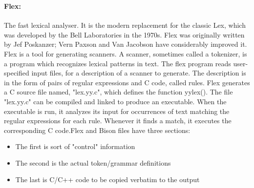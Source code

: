 \textbf{Flex:}\\\\
The fast lexical analyser. It is the modern replacement for the classic Lex, which was developed by the Bell Laboratories in the 1970s.
Flex was originally written by Jef Poskanzer; Vern Paxson and Van Jacobson have considerably improved it. Flex is a tool for generating scanners. A scanner, sometimes called a tokenizer, is a program which recognizes lexical patterns in text. The flex program reads user-specified input files, for a description of a scanner to generate. The description is in the form of pairs of regular expressions and C code, called rules. Flex generates a C source file named, "lex.yy.c", which defines the function yylex(). The file "lex.yy.c" can be compiled and linked to produce an executable. When the executable is run, it analyzes its input for occurrences of text matching the regular expressions for each rule. Whenever it finds a match, it executes the corresponding C code.Flex and Bison files have three sections:\\
\begin{itemize}
\item The first is sort of "control" information
\item The second is the actual token/grammar definitions
\item The last is C/C++ code to be copied verbatim to the output
\end{itemize}

